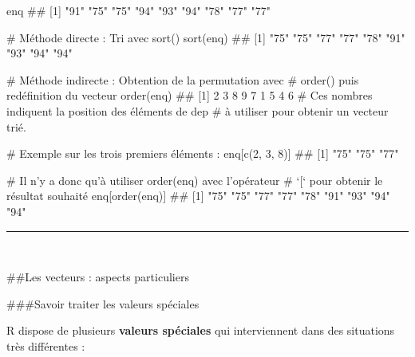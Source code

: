 \documentclass[12pt,twosided, notitlepage]{book}
\newenvironment{Shaded}{}{}
\newcommand{\CommentTok}[1]{\textcolor[rgb]{0.00,0.50,0.00}{#1}}
\newcommand{\DecValTok}[1]{#1}
\newcommand{\KeywordTok}[1]{\textcolor[rgb]{0.00,0.00,1.00}{#1}}
\newcommand{\NormalTok}[1]{#1}
\renewenvironment{Shaded}{\begin{snugshade}}{\end{snugshade}}
\begin{document}
\begin{Shaded}
\begin{Highlighting}[]
\NormalTok{enq}
\NormalTok{  ## [1] "91" "75" "75" "94" "93" "94" "78" "77" "77"}

\CommentTok{# Méthode directe : Tri avec sort()}
\KeywordTok{sort}\NormalTok{(enq)}
\NormalTok{  ## [1] "75" "75" "77" "77" "78" "91" "93" "94" "94"}

\CommentTok{# Méthode indirecte : Obtention de la permutation avec }
\CommentTok{# order() puis redéfinition du vecteur}
\KeywordTok{order}\NormalTok{(enq)}
\NormalTok{  ## [1] 2 3 8 9 7 1 5 4 6}
\CommentTok{# Ces nombres indiquent la position des éléments de dep}
\CommentTok{# à utiliser pour obtenir un vecteur trié. }

\CommentTok{# Exemple sur les trois premiers éléments :}
\NormalTok{enq[}\KeywordTok{c}\NormalTok{(}\DecValTok{2}\NormalTok{, }\DecValTok{3}\NormalTok{, }\DecValTok{8}\NormalTok{)]}
\NormalTok{  ## [1] "75" "75" "77"}

\CommentTok{# Il n'y a donc qu'à utiliser order(enq) avec l'opérateur}
\CommentTok{# `[` pour obtenir le résultat souhaité}
\NormalTok{enq[}\KeywordTok{order}\NormalTok{(enq)]}
\NormalTok{  ## [1] "75" "75" "77" "77" "78" "91" "93" "94" "94"}
\end{Highlighting}
\end{Shaded}

\begin{center} \rule{0.5\linewidth}{\linethickness}\end{center} 
 \bigskip 
 \fi

~

\#\#Les vecteurs : aspects particuliers

\#\#\#Savoir traiter les valeurs spéciales

R dispose de plusieurs \textbf{valeurs spéciales} qui interviennent dans
des situations très différentes :
\end{document}
